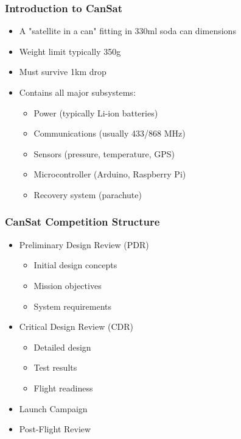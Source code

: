 \documentclass{beamer}
\begin{document}
\begin{frame}
\frametitle{Introduction to CanSat}
\begin{itemize}
\item A "satellite in a can" fitting in 330ml soda can dimensions
\item Weight limit typically 350g
\item Must survive 1km drop
\item Contains all major subsystems:
    \begin{itemize}
    \item Power (typically Li-ion batteries)
    \item Communications (usually 433/868 MHz)
    \item Sensors (pressure, temperature, GPS)
    \item Microcontroller (Arduino, Raspberry Pi)
    \item Recovery system (parachute)
    \end{itemize}
\end{itemize}
\end{frame}

\begin{frame}
\frametitle{CanSat Competition Structure}
\begin{itemize}
\item Preliminary Design Review (PDR)
    \begin{itemize}
    \item Initial design concepts
    \item Mission objectives
    \item System requirements
    \end{itemize}
\item Critical Design Review (CDR)
    \begin{itemize}
    \item Detailed design
    \item Test results
    \item Flight readiness
    \end{itemize}
\item Launch Campaign
\item Post-Flight Review
\end{itemize}
\end{frame}
\end{document}
